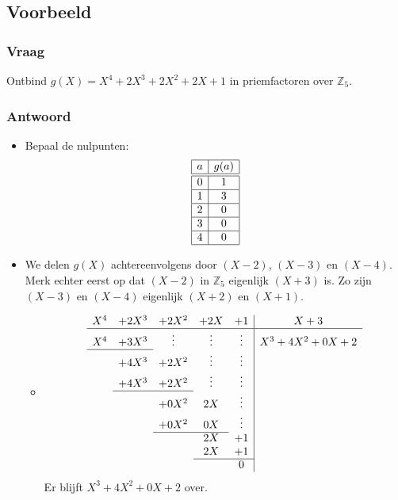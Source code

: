 \documentclass[main.tex]{subfiles}
\begin{document}
\subsection*{Voorbeeld}
\subsubsection*{Vraag}
Ontbind $g(X) = X^{4} + 2X^{3} + 2X^{2} + 2X + 1$ in priemfactoren over $\mathbb{Z}_{5}$.
\subsubsection*{Antwoord}
\begin{itemize}
\item Bepaal de nulpunten:
  \[
  \begin{array}{|c|c|}
    \hline
    a & g(a)\\
    \hline
    \hline
    0 & 1\\ \hline
    1 & 3\\ \hline
    2 & 0\\ \hline
    3 & 0\\ \hline
    4 & 0\\ \hline
  \end{array}
  \]
\item We delen $g(X)$ achtereenvolgens door $(X-2)$, $(X-3)$ en $(X-4)$.
  Merk echter eerst op dat $(X-2)$ in $\mathbb{Z}_{5}$ eigenlijk $(X+3)$ is.
  Zo zijn $(X-3)$ en $(X-4)$ eigenlijk $(X+2)$ en $(X+1)$.
  \begin{itemize}
  \item 
    \[
    \begin{array}{ccccc|c}
      X^{4} &+2X^{3} &+2X^{2} &+2X    &+1     & X+3\\\hline
      X^{4} &+3X^{3} &\vdots &\vdots &\vdots & X^{3}+4X^{2}+0X+2\\\cline{1-2}
      &+4X^{3} & +2X^{2} &\vdots &\vdots &\\
      &+4X^{3} & +2X^{2} &\vdots &\vdots &\\\cline{2-3}
      &       & +0X^{2} & 2X    &\vdots &\\
      &       & +0X^{2} & 0X    &\vdots &\\\cline{3-4}
      &       &        & 2X    &+1     &\\
      &       &        & 2X    &+1     &\\\cline{4-5}
      &       &        &       & 0     &
    \end{array}
    \]
    Er blijft $X^{3}+4X^{2}+0X+2$ over.

\end{itemize}
\end{itemize}
\end{document}
